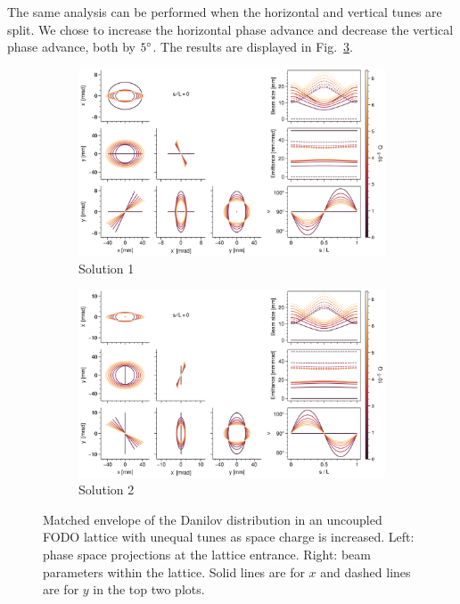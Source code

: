 The same analysis can be performed when the horizontal and vertical tunes are split. We chose to increase the horizontal phase advance and decrease the vertical phase advance, both by $5\degree$. The results are displayed in Fig.~\ref{fig:matched_vs_sc_fodo_split}. 
%
\begin{figure}[!p]
    \begin{subfigure}{1.0\textwidth}
        \includegraphics[width=\textwidth]{Images/chapter2/matched_vs_sc_fodo_split_mode1.png}
        \caption{Solution 1}
        \label{fig:matched_vs_sc_fodo_split_a}
    \end{subfigure}
    \vfill
    \vfill
    \begin{subfigure}{1.0\textwidth}
        \centering
        \includegraphics[width=\textwidth]{Images/chapter2/matched_vs_sc_fodo_split_mode2.png}
        \caption{Solution 2}
        \label{fig:matched_vs_sc_fodo_split_b}
    \end{subfigure}
    \caption{Matched envelope of the Danilov distribution in an uncoupled FODO lattice with unequal tunes as space charge is increased. Left: phase space projections at the lattice entrance. Right: beam parameters within the lattice. Solid lines are for $x$ and dashed lines are for $y$ in the top two plots.}
    \label{fig:matched_vs_sc_fodo_split}
\end{figure}
